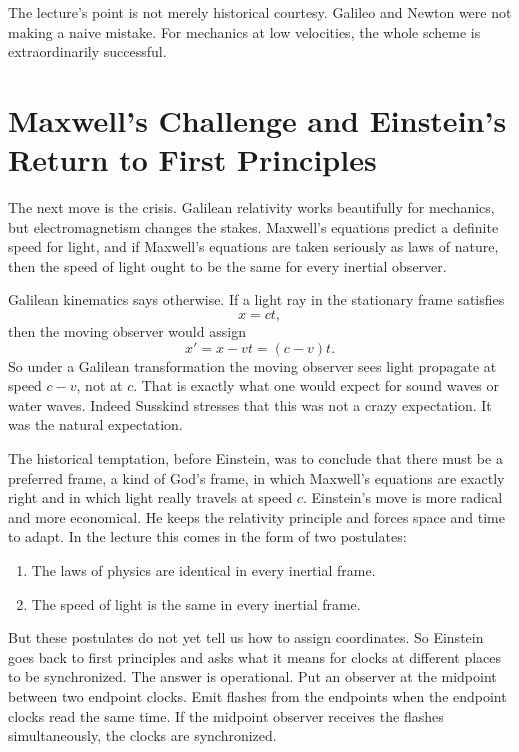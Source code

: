 The lecture's point is not merely historical courtesy. Galileo and Newton were not making a naive mistake. For mechanics at low velocities, the whole scheme is extraordinarily successful.

\section{Maxwell's Challenge and Einstein's Return to First Principles}

The next move is the crisis. Galilean relativity works beautifully for mechanics, but electromagnetism changes the stakes. Maxwell's equations predict a definite speed for light, and if Maxwell's equations are taken seriously as laws of nature, then the speed of light ought to be the same for every inertial observer.

Galilean kinematics says otherwise. If a light ray in the stationary frame satisfies
\begin{equation}
x=ct,
\end{equation}
then the moving observer would assign
\begin{equation}
x'=x-vt=(c-v)t.
\end{equation}
So under a Galilean transformation the moving observer sees light propagate at speed \(c-v\), not at \(c\). That is exactly what one would expect for sound waves or water waves. Indeed Susskind stresses that this was not a crazy expectation. It was the natural expectation.

The historical temptation, before Einstein, was to conclude that there must be a preferred frame, a kind of God's frame, in which Maxwell's equations are exactly right and in which light really travels at speed \(c\). Einstein's move is more radical and more economical. He keeps the relativity principle and forces space and time to adapt. In the lecture this comes in the form of two postulates:
\begin{enumerate}
\item The laws of physics are identical in every inertial frame.
\item The speed of light is the same in every inertial frame.
\end{enumerate}

But these postulates do not yet tell us how to assign coordinates. So Einstein goes back to first principles and asks what it means for clocks at different places to be synchronized. The answer is operational. Put an observer at the midpoint between two endpoint clocks. Emit flashes from the endpoints when the endpoint clocks read the same time. If the midpoint observer receives the flashes simultaneously, the clocks are synchronized.

